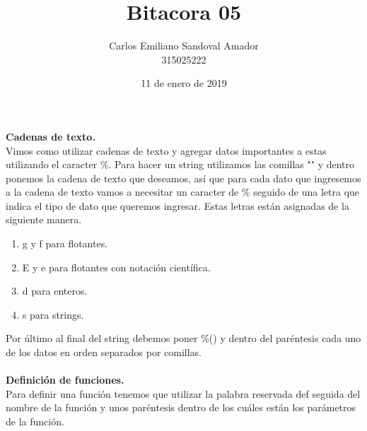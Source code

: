 \documentclass[letterpaper, 12pt, oneside]{article}%
\title{Bitacora 05}
\author{Carlos Emiliano Sandoval Amador \\ 315025222}
\date{11 de enero de 2019}
\begin{document}
	\maketitle
	\textbf{Cadenas de texto.} \\ Vimos como utilizar cadenas de texto y agregar datos importantes a estas utilizando el caracter  \%. Para hacer un string utilizamos las comillas "" y dentro ponemos la cadena de texto que deseamos, así que para cada dato que ingresemos a la cadena de texto vamos a necesitar un caracter de \% seguido de una letra que indica el tipo de dato que queremos ingresar. Estas letras están asignadas de la siguiente manera.
	\begin{enumerate} %
		\item g y f para flotantes.
		\item E y e para flotantes con notación científica.
		\item d para enteros.
		\item s para strings.
	\end{enumerate}
	Por último al final del string debemos poner \%() y dentro del paréntesis cada uno de los datos en orden separados por comillas. \\
	 \\ %
	  \textbf{Definición de funciones.} \\ Para definir una función tenemos que utilizar la palabra reservada def seguida del nombre de la función y unos paréntesis dentro de los cuáles están los parámetros de la función.
	
 	
\end{document}
